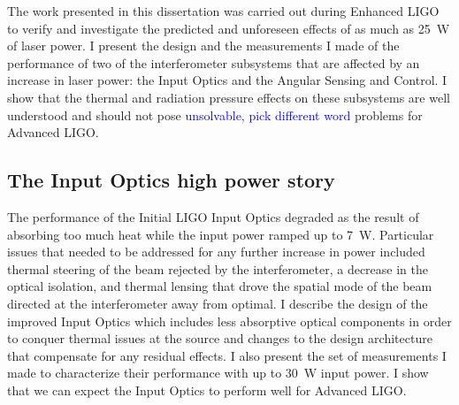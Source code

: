 The work presented in this dissertation was carried out during
Enhanced LIGO to verify and investigate the predicted and unforeseen
effects of as much as 25~W of laser power. I present the design and
the measurements I made of the performance of two of the
interferometer subsystems that are affected by an increase in laser
power: the Input Optics and the Angular Sensing and Control. I show
that the thermal and radiation pressure effects on these subsystems
are well understood and should not pose \textcolor{blue}{unsolvable,
  pick different word} problems for
Advanced LIGO.


\subsection{The Input Optics high power story} 
The performance of the Initial LIGO Input Optics degraded as the
result of absorbing too much heat while the input power ramped up to
7~W. Particular issues that needed to be addressed for any further
increase in power included thermal steering of the beam rejected by
the interferometer, a decrease in the optical isolation, and thermal
lensing that drove the spatial mode of the beam directed at the
interferometer away from optimal. I describe the design of the
improved Input Optics which includes less absorptive optical
components in order to conquer thermal issues at the source and
changes to the design architecture that compensate for any residual
effects. I also present the set of measurements I made to characterize
their performance with up to 30~W input power. I show that we can
expect the Input Optics to perform well for Advanced LIGO.



